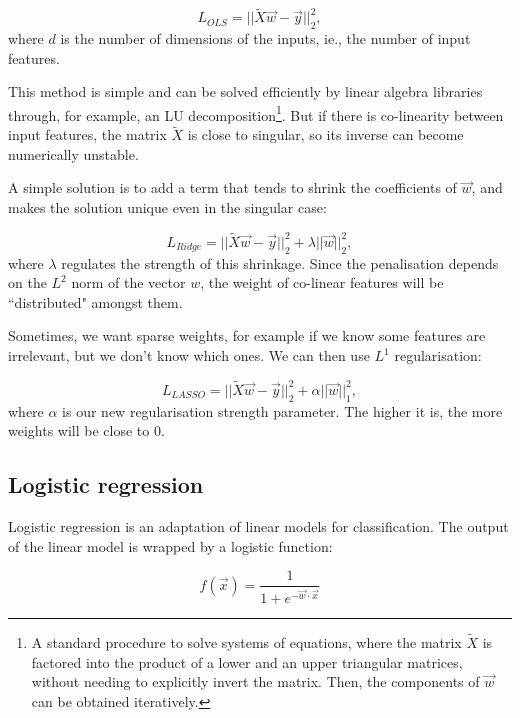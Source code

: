 \begin{equation*}
 L_{OLS} = || \widetilde  X \vec w - \vec y ||_2 ^2,
\end{equation*}
where $d$ is the number of dimensions of the inputs, ie., the number of input features.

This method is simple and can be solved efficiently by linear algebra libraries through, for example, an LU decomposition\footnote{A standard procedure to solve systems of equations, where the matrix $\widetilde{X}$ is factored into the product of a lower and an upper triangular matrices, without needing to explicitly invert the matrix. Then, the components of $\vec w$ can be obtained iteratively.}.
But if there is co-linearity between input features, the matrix $ \widetilde X$ is close to singular, so its inverse can become numerically unstable.

A simple solution  is to add a term that tends to shrink the coefficients of $\vec w$, and makes the solution unique even in the singular case:

\[ L_{Ridge} = || \widetilde  X \vec w - \vec y ||_2 ^2 + \lambda ||\vec w||_2^2,\]
where $\lambda$ regulates the strength of this shrinkage.
Since the penalisation depends on the $L^2$ norm of the vector $w$, the weight of co-linear features will be ``distributed" amongst them.

Sometimes, we want sparse weights,  for example if we know some features are irrelevant, but we don't know which ones.
We can then use $L^1$ regularisation:

\[ L_{LASSO} = || \widetilde X \vec w - \vec y ||_2 ^2 + \alpha ||\vec w||_1^2,\]
where $\alpha$ is our new regularisation strength parameter.
The higher it is, the more weights will be close to $0$.


\subsection{Logistic regression}\label{sec:logistic_regression}
Logistic regression  is an adaptation of linear models for classification.
The output of the linear model is wrapped by a logistic function:

\begin{equation*}
f(\vec x) = \frac{1}{1 + e^{- \vec{w} \cdot \vec x}}
\end{equation*}

